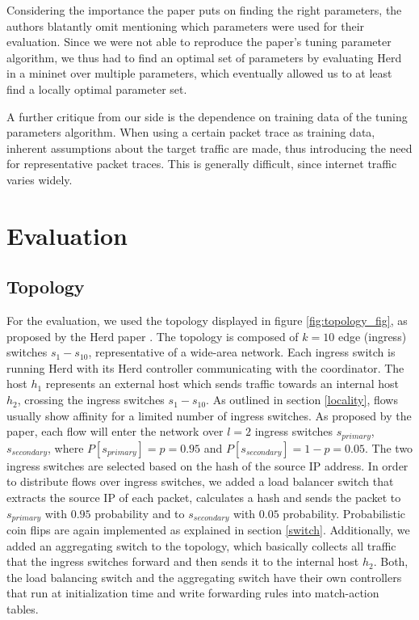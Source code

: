 \documentclass[11pt,oneside,a4paper]{article}
\begin{document}
Considering the importance the paper puts on finding the right parameters, the authors blatantly omit mentioning which parameters were used for their evaluation. Since we were not able to reproduce the paper's tuning parameter algorithm, we thus had to find an optimal set of parameters by evaluating Herd in a mininet over multiple parameters, which eventually allowed us to at least find a locally optimal parameter set.

A further critique from our side is the dependence on training data of the tuning parameters algorithm. When using a certain packet trace as training data, inherent assumptions about the target traffic are made, thus introducing the need for representative packet traces. This is generally difficult, since internet traffic varies widely.

\section{Evaluation}

\subsection{Topology} \label{topology}

For the evaluation, we used the topology displayed in figure \ref{fig:topology_fig}, as proposed by the Herd paper \cite{anon2019herd}. The topology is composed of $k=10$ edge (ingress) switches $s_1 - s_{10}$, representative of a wide-area network. Each ingress switch is running Herd with its Herd controller communicating with the coordinator. The host $h_1$ represents an external host which sends traffic towards an internal host $h_2$, crossing the ingress switches $s_1 - s_{10}$. As outlined in section \ref{locality}, flows usually show affinity for a limited number of ingress switches. As proposed by the paper, each flow will enter the network over $l = 2$ ingress switches $s_{primary}$, $s_{secondary}$, where $P[s_{primary}] = p = 0.95$ and $P[s_{secondary}] = 1-p = 0.05$. The two ingress switches are selected based on the hash of the source IP address. In order to distribute flows over ingress switches, we added a load balancer switch that extracts the source IP of each packet, calculates a hash and sends the packet to $s_{primary}$ with $0.95$ probability and to $s_{secondary}$ with $0.05$ probability. Probabilistic coin flips are again implemented as explained in section \ref{switch}. Additionally, we added an aggregating switch to the topology, which basically collects all traffic that the ingress switches forward and then sends it to the internal host $h_2$. Both, the load balancing switch and the aggregating switch have their own controllers that run at initialization time and write forwarding rules into match-action tables.
\end{document}
